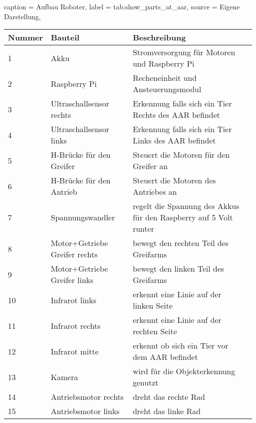 \begin{dhbwtable}{%
    caption	= Aufbau Roboter,
    label	= tab:show_parts_at_aar,
    source	= Eigene Darstellung,
}
    \begin{tabular}{llll}
        \toprule
        \textbf{Nummer}     & \textbf{Bauteil}      &\textbf{Beschreibung}   \\\midrule
        1   	            & Akku                  & Stromversorgung für Motoren und Raspberry Pi\\
        2                   & Raspberry Pi          & Recheneinheit und Ansteuerungsmodul \\
        3                   & Ultraschallsensor rechts   & Erkennung falls sich ein Tier Rechts des AAR befindet  \\
        4                   & Ultraschallsensor links   & Erkennung falls sich ein Tier Links des AAR befindet  \\
        5                   & H-Brücke für den Greifer   & Steuert die Motoren für den Greifer an   \\
        6                   & H-Brücke für den Antrieb   & Steuert die Motoren des Antriebes an   \\
        7                   & Spannungswandler   & regelt die Spannung des Akkus für den Raspberry auf 5 Volt runter  \\
        8                   & Motor+Getriebe Greifer rechts   & bewegt den rechten Teil des Greifarms  \\
        9                   & Motor+Getriebe Greifer links   & bewegt den linken Teil des Greifarms  \\
        10                  & Infrarot links   & erkennt eine Linie auf der linken Seite  \\
        11                  & Infrarot rechts   & erkennt eine Linie auf der rechten Seite  \\
        12                  & Infrarot mitte   & erkennt ob sich ein Tier vor dem AAR befindet  \\
        13                  & Kamera   & wird für die Objekterkennung genutzt  \\
        14                  & Antriebsmotor rechts   & dreht das rechte Rad  \\
        15                  & Antriebsmotor links   & dreht das linke Rad  \\\bottomrule
    \end{tabular}    
\end{dhbwtable}




